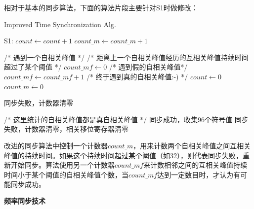 \documentclass[titlepage]{article}
\numberwithin{figure}{section}
\numberwithin{equation}{section}
\begin{document}
相对于基本的同步算法，下面的算法片段主要针对S1时做修改：

\begin{algorithm}[H]
\caption{Improved Time Synchronization Alg.}
\begin{algorithmic}[1]
\State S1:
\State $count \gets count + 1$
\Else
\State $count\_m \gets count\_m + 1$
\EndIf

 /* 遇到一个自相关峰值 */
 /* 距离上一个自相关峰值经历的互相关峰值持续时间超过了某个阈值 */
\State $count\_mf \gets 0$ /* 遇到假的自相关峰值*/
\Else
\State $count\_mf \gets count\_mf + 1$ /* 终于遇到真的自相关峰值:-) */
\State $count \gets 0$
\State $count\_m \gets 0$
\EndIf
\EndIf

\State 同步失败，计数器清零
\EndIf

 /* 这里统计的自相关峰值都是真自相关峰值 */
\State 同步成功，收集96个符号值
\Else
\State 同步失败，计数器清零，相关移位寄存器清零
\EndIf
\EndIf

\end{algorithmic}
\end{algorithm}

改进的同步算法中控制一个计数器$count\_m$，用来计数两个自相关峰值之间互相关峰值的持续时间。如果这个持续时间超过某个阈值（如32），则代表同步失败，重新开始同步。算法使用另一个计数器$count\_mf$来计数相邻之间的互相关峰值持续时间小于某个阈值的自相关峰值个数，当$count\_mf$达到一定数目时，才认为有可能同步成功。


\textbf{频率同步技术}




\end{document}
